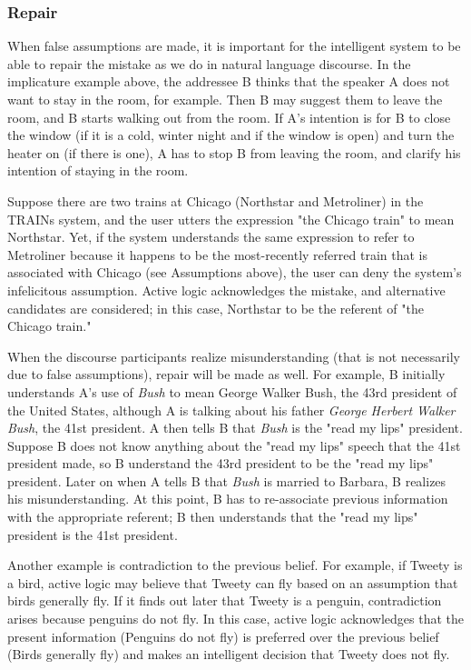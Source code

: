 \subsubsection{Repair}
When false assumptions are made, it is important for the intelligent
system to be able to repair the mistake as we do in natural language
discourse.  In the implicature example above, the addressee B thinks
that the speaker A does not want to stay in the room, for example.
Then B may suggest them to leave the room, and B starts walking out
from the room.  If A's intention is for B to close the
window (if it is a cold, winter night and if the window is open) and
turn the heater on (if there is one), A has to stop B from leaving the
room, and clarify his intention of staying in the room.

Suppose there are two trains at Chicago (Northstar and Metroliner) in the TRAINs system, and the user utters the expression "the Chicago train" to mean Northstar.  Yet, if the system understands the same expression to refer to Metroliner because it happens to be the most-recently referred train that is associated with Chicago (see Assumptions above), the user can deny the system's infelicitous assumption.  Active logic acknowledges the mistake, and alternative candidates are considered; in this case, Northstar to be the referent of "the Chicago train."

When the discourse participants realize misunderstanding (that is not
necessarily due to false assumptions), repair will be made as well.
For example, B initially understands A's use of {\em Bush} to mean
{George Walker Bush}, the 43rd president of the United States,
although A is talking about his father {\em George Herbert Walker
Bush}, the 41st president.  A then tells B that {\em Bush} is the
"read my lips" president.  Suppose B does not know anything about the "read
my lips" speech that the 41st president made, so B understand the 43rd
president to be the "read my lips" president.  Later on when A tells B
that {\em Bush} is married to Barbara, B realizes his
misunderstanding.  At this point, B has to re-associate previous
information with the appropriate referent; B then understands that the
"read my lips" president is the 41st president.   

Another example is contradiction to the previous belief.  For example, if Tweety is a bird, active logic may believe that Tweety can fly based on an assumption that birds generally fly.  If it finds out later that Tweety is a penguin, contradiction arises because penguins do not fly.  In this case, active logic acknowledges that the present information (Penguins do not fly) is preferred over the previous belief (Birds generally fly) and makes an intelligent decision that Tweety does not fly.

%
